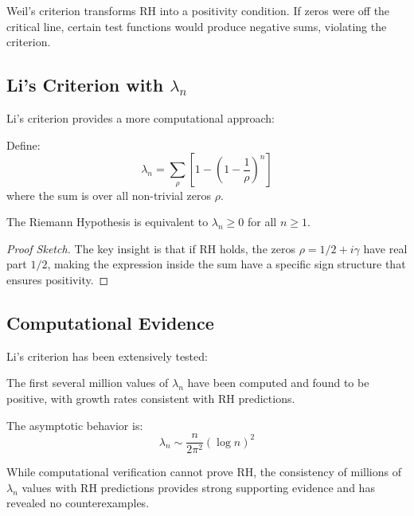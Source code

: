\begin{remark}[Intuition]
Weil's criterion transforms RH into a positivity condition. If zeros were off the critical line, certain test functions would produce negative sums, violating the criterion.
\end{remark}

\subsection{Li's Criterion with $\lambda_n$}

Li's criterion provides a more computational approach:

\begin{definition}
Define:
\begin{equation}
\lambda_n = \sum_{\rho} \left[1 - \left(1 - \frac{1}{\rho}\right)^n\right]
\end{equation}
where the sum is over all non-trivial zeros $\rho$.
\end{definition}

\begin{theorem}
The Riemann Hypothesis is equivalent to $\lambda_n \geq 0$ for all $n \geq 1$.
\end{theorem}

\begin{proof}[Proof Sketch]
The key insight is that if RH holds, the zeros $\rho = 1/2 + i\gamma$ have real part $1/2$, making the expression inside the sum have a specific sign structure that ensures positivity.
\end{proof}

\subsection{Computational Evidence}

Li's criterion has been extensively tested:

\begin{theorem}
The first several million values of $\lambda_n$ have been computed and found to be positive, with growth rates consistent with RH predictions.
\end{theorem}

The asymptotic behavior is:
\begin{equation}
\lambda_n \sim \frac{n}{2\pi^2} (\log n)^2
\end{equation}

\begin{remark}
While computational verification cannot prove RH, the consistency of millions of $\lambda_n$ values with RH predictions provides strong supporting evidence and has revealed no counterexamples.
\end{remark}

